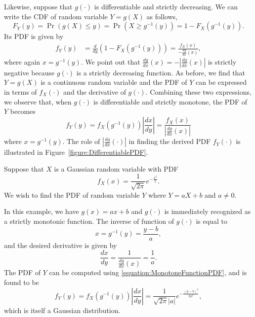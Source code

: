 Likewise, suppose that $g(\cdot)$ is differentiable and strictly decreasing.
We can write the CDF of random variable $Y = g(X)$ as follows,
\begin{equation*}
F_Y(y) = \Pr (g(X) \leq y)
= \Pr \left( X \geq g^{-1}(y) \right)
= 1 - F_X \left( g^{-1} (y) \right) .
\end{equation*}
Its PDF is given by
\begin{equation*}
\begin{split}
f_Y (y) &= \frac{d}{dy} \left( 1 - F_X \left( g^{-1} (y) \right) \right)
= \frac{f_X (x)}{- \frac{dg}{dx}(x)} ,
\end{split}
\end{equation*}
where again $x = g^{-1} (y)$.
We point out that $\frac{dg}{dx}(x) = - \left| \frac{dg}{dx}(x) \right|$ is strictly negative because $g(\cdot)$ is a strictly decreasing function.
As before, we find that $Y = g(X)$ is a continuous random variable and the PDF of $Y$ can be expressed in terms of $f_X( \cdot)$ and the derivative of $g(\cdot)$.
Combining these two expressions, we observe that, when $g(\cdot)$ is differentiable and strictly monotone, the PDF of $Y$ becomes
\begin{equation} \label{equation:MonotoneFunctionPDF}
f_Y (y) = f_X \left( g^{-1} (y) \right) \left| \frac{dx}{dy} \right|
= \frac{f_X (x)}{\left| \frac{dg}{dx}(x) \right|}
\end{equation}
where $x = g^{-1}(y)$.
The role of $\left| \frac{dg}{dx} (\cdot) \right|$ in finding the derived PDF $f_Y(\cdot)$ is illustrated in Figure~\ref{figure:DifferentiablePDF}.

\begin{example}
Suppose that $X$ is a Gaussian random variable with PDF
\begin{equation*}
f_X(x) = \frac{1}{\sqrt{2 \pi}} e^{- \frac{x^2}{2}} .
\end{equation*}
We wish to find the PDF of random variable $Y$ where $Y = a X + b$ and $a \neq 0$.

In this example, we have $g(x) = ax + b$ and $g(\cdot)$ is immediately recognized as a strictly monotonic function.
The inverse of function of $g(\cdot)$ is equal to
\begin{equation*}
x = g^{-1} (y) = \frac{y - b}{a} ,
\end{equation*}
and the desired derivative is given by
\begin{equation*}
\frac{dx}{dy} = \frac{1}{\frac{dg}{dx} (x)} = \frac{1}{a} .
\end{equation*}
The PDF of $Y$ can be computed using \eqref{equation:MonotoneFunctionPDF}, and is found to be
\begin{equation*}
f_Y(y) = f_X \left( g^{-1} (y) \right) \left| \frac{dx}{dy} \right|
= \frac{1}{\sqrt{2 \pi} |a|} e^{- \frac{(y-b)^2}{2 a^2} } ,
\end{equation*}
which is itself a Gaussian distribution.
\end{example}

